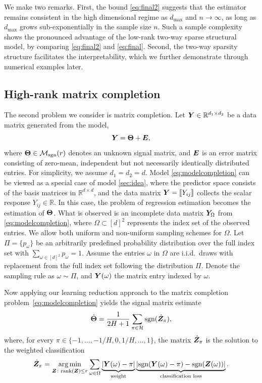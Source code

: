 \documentclass[aos]{imsart}
\theoremstyle{definition}
\newcommand*{\KeepStyleUnderBrace}[1]{%
\mathop{%
\mathchoice
{\underbrace{\displaystyle#1}}%
{\underbrace{\textstyle#1}}%
{\underbrace{\scriptstyle#1}}%
{\underbrace{\scriptscriptstyle#1}}%
}\limits
}
\def\sign{\textup{sgn}}
\def\rank{\textup{rank}}
\def\caliM{\tM_{\textup{sgn}}}
\begin{document}
\noindent
We make two remarks. First, the bound \eqref{eq:final2} suggests that the estimator remains consistent in the high dimensional regime as $d_{\max}$ and $n\to \infty$, as long as $d_{\max}$ grows sub-exponentially in the sample size $n$. Such a sample complexity shows the pronounced advantage of the low-rank two-way sparse structural model, by comparing \eqref{eq:final2} and \eqref{eq:final}. Second, the two-way sparsity structure facilitates the interpretability, which we further demonstrate through numerical examples later. 



\subsection{High-rank matrix completion}\label{sec:matrixcompletion}

The second problem we consider is matrix completion. Let $\bm Y\in\mathbb{R}^{d_1\times d_2}$ be a data matrix generated from the model,
\begin{equation}\label{eq:modelcompletion}
\mY=\mTheta+\mE,
\end{equation}
where $\mTheta\in\caliM(r)$ denotes an unknown signal matrix, and $\bm{E}$ is an error matrix consisting of zero-mean, independent but not necessarily identically distributed entries. For simplicity, we assume $d_1=d_2=d$. Model \eqref{eq:modelcompletion} can be viewed as a special case of model \eqref{sec:idea}, where the predictor space consists of the basis matrices in $\mathbb{R}^{d\times d}$, and the data matrix $\bm Y=\llbracket Y_{ij} \rrbracket$ collects the scalar response $Y_{ij} \in \mathbb{R}$. In this case, the problem of regression estimation becomes the estimation of $\bm{\Theta}$. What is observed is an incomplete data matrix $\bm Y_\Omega$ from \eqref{eq:modelcompletion}, where $\Omega \subset [d]^2$ represents the index set of the observed entries. We allow both uniform and non-uniform sampling schemes for $\Omega$. Let $\Pi=\{p_\omega\}$ be an arbitrarily predefined probability distribution over the full index set with $\sum_{\omega\in[d]^2}p_\omega=1$. Assume the entries $\omega$ in $\Omega$ are i.i.d.\ draws with replacement from the full index set following the distribution $\Pi$. Denote the sampling rule as $\omega \sim \Pi$, and $\bm Y(\omega)$ the matrix entry indexed by $\omega$.  

Now applying our learning reduction approach to the matrix completion problem~\eqref{eq:modelcompletion} yields the signal matrix estimate
\begin{equation}\label{eq:est}
\hat \mTheta = {1\over 2H+1}\sum_{\pi \in \tH}\sign(\hat \mZ_\pi),
\end{equation}
where, for every $\pi\in\{-1,\ldots,-1/H,0,1/H,\ldots,1\}$, the matrix $\hat {\bm Z}_\pi$ is the solution to the weighted classification
\begin{equation*}
\hat \mZ_\pi = \argmin_{\mZ\colon \rank(\mZ)\leq r}\sum_{\omega\in\Omega} \KeepStyleUnderBrace{|\mY(\omega)-\pi|}_{\text{weight}}\KeepStyleUnderBrace{|\sign(\mY(\omega)-\pi)-\sign(\mZ(\omega))|}_{\text{classification loss}}.
\end{equation*}
\end{document}
